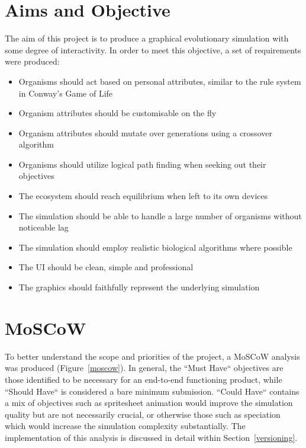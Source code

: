 \documentclass[a4paper, oneside, 11pt]{report}
\begin{document}
\section{Aims and Objective}
The aim of this project is to produce a graphical evolutionary simulation with some degree of interactivity. In order to meet this objective, a set of requirements were produced:
\begin{itemize}\label{requirements}
	\item Organisms should act based on personal attributes, similar to the rule system in Conway's Game of Life
	\item Organism attributes should be customisable on the fly
	\item Organism attributes should mutate over generations using a crossover algorithm
	\item Organisms should utilize logical path finding when seeking out their objectives
	\item The ecosystem should reach equilibrium when left to its own devices
	\item The simulation should be able to handle a large number of organisms without noticeable lag
	\item The simulation should employ realistic biological algorithms where possible
	\item The UI should be clean, simple and professional
	\item The graphics should faithfully represent the underlying simulation
\end{itemize}

\section{MoSCoW}
To better understand the scope and priorities of the project, a MoSCoW analysis was produced (Figure~\ref{moscow}). In general, the ``Must Have`` objectives are those identified to be necessary for an end-to-end functioning product, while ``Should Have`` is considered a bare minimum submission. ``Could Have`` contains a mix of objectives such as spritesheet animation would improve the simulation quality but are not necessarily crucial, or otherwise those such as speciation which would increase the simulation complexity substantially. The implementation of this analysis is discussed in detail within Section~\ref{versioning}.
\smallskip 
\end{document}
